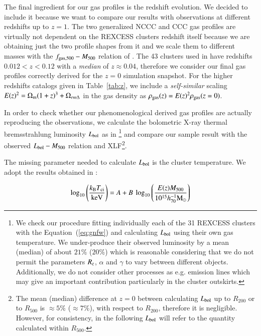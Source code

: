 \documentclass[traditabstract]{aa}
\begin{document}
The final ingredient for our gas profiles is the redshift evolution. We decided to include it because we want to compare our results with observations at different redshifts up to $z=1$. The two generalized NCCC and CCC gas profiles are virtually not dependent on the REXCESS clusters redshift itself because we are obtaining just the two profile shapes from it and we scale them to different masses with the $f_{\rm{gas},500}-M_{500}$ relation of \cite{2009ApJ...693.1142S}. The 43 clusters used in \cite{2009ApJ...693.1142S} have redshifts $0.012 < z < 0.12$ with a \emph{median} of $z \approx 0.04$, therefore we consider our final gas profiles correctly derived for the $z = 0$ simulation snapshot. For the higher redshifts catalogs given in Table~\ref{tab:z}, we include a \emph{self-similar} scaling $E(z)^{2} = \Omega_{\rm{m}} (1+z)^{3} + \Omega_{rm{\Delta}}$ in the gas density as $\rho_{\rm{gas}}(z) = E(z)^{2} \rho_{\rm{gas}}(z=0)$.

In order to check whether our phenomenological derived gas profiles are actually reproducing the observations, we calculate the bolometric X-ray thermal bremsstrahlung luminosity $L_{\rm{bol}}$ as in \cite{1988xrec.book.....S}\footnote[5]{We check our procedure fitting individually each of the 31 REXCESS clusters with the Equation~(\ref{eq:gnfw}) and calculating $L_{\rm{bol}}$ using their own gas temperature. We under-produce their observed luminosity by a mean (median) of about $21\%$ ($20\%$) which is reasonable considering that we do not permit the parameters $R_{\rm{c}}$, $\alpha$ and $\gamma$ to vary between different objects. Additionally, we do not consider other processes as e.g. emission lines which may give an important contribution particularly in the cluster outskirts.} and compare our sample result with the observed $L_{\rm{bol}} - M_{500}$ relation and XLF\footnote[6]{The mean (median) difference at $z=0$ between calculating $L_{\rm{bol}}$ up to $R_{200}$ or to $R_{500}$ is $\approx 5\%$ ($\approx 7\%$), with respect to $R_{200}$, therefore it is negligible. However, for consistency, in the following $L_{\rm{bol}}$ will refer to the quantity calculated within $R_{500}$.}. 

The missing parameter needed to calculate $L_{\rm{bol}}$ is the cluster temperature. We adopt the results obtained in \cite{2010MNRAS.406.1773M}:

\begin{equation}
\log_{10} \left( \frac{k_{\rm{B}}T_{\rm{ci}}}{\rm{keV}} \right) = A + B~\log_{10} \left( \frac{E(z) M_{500}}{10^{15} h_{70}^{-1} \rm{M_{\odot}}} \right)
\label{eq:temp}
\end{equation}
 
\end{document}
